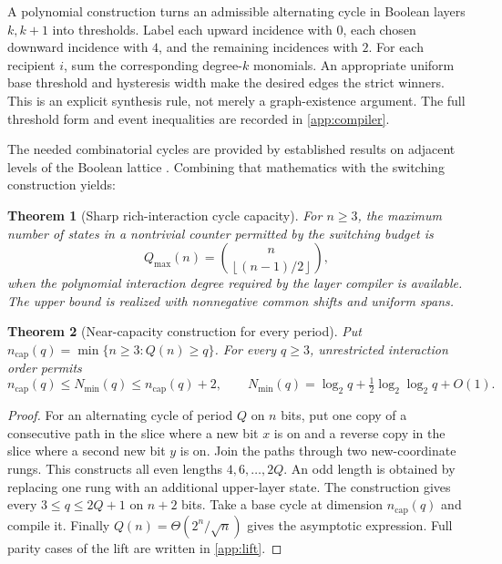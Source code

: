 \documentclass[12pt,letterpaper]{article}
\newtheorem{theorem}{Theorem}[section]
\theoremstyle{definition}\newtheorem{definition}[theorem]{Definition}
\theoremstyle{remark}\newtheorem{remark}[theorem]{Remark}
\newcommand{\Nmin}{N_{\min}}
\newcommand{\floor}[1]{\left\lfloor #1\right\rfloor}
\begin{document}
A polynomial construction turns an admissible alternating cycle in Boolean layers $k,k+1$ into thresholds. Label each upward incidence with $0$, each chosen downward incidence with $4$, and the remaining incidences with $2$. For each recipient $i$, sum the corresponding degree-$k$ monomials. An appropriate uniform base threshold and hysteresis width make the desired edges the strict winners. This is an explicit synthesis rule, not merely a graph-existence argument. The full threshold form and event inequalities are recorded in \cref{app:compiler}.

The needed combinatorial cycles are provided by established results on adjacent levels of the Boolean lattice \citep{mutzesu2017,mutze2016}. Combining that mathematics with the switching construction yields:
\begin{theorem}[Sharp rich-interaction cycle capacity]\label{thm:capacity}
For $n\ge3$, the maximum number of states in a nontrivial counter permitted by the switching budget is
\begin{equation}\label{eq:sharp}
 Q_{\max}(n)=\binom{n}{\floor{(n-1)/2}},
\end{equation}
when the polynomial interaction degree required by the layer compiler is available. The upper bound is realized with nonnegative common shifts and uniform spans.
\end{theorem}

\begin{theorem}[Near-capacity construction for every period]\label{thm:everyperiod}
Put $n_{\mathrm{cap}}(q)=\min\{n\ge3:Q(n)\ge q\}$. For every $q\ge3$, unrestricted interaction order permits
\begin{equation}\label{eq:nearc}
 n_{\mathrm{cap}}(q)\le\Nmin(q)\le n_{\mathrm{cap}}(q)+2,\qquad
 \Nmin(q)=\log_2 q+\tfrac12\log_2\log_2 q+O(1).
\end{equation}
\end{theorem}
\begin{proof}
For an alternating cycle of period $Q$ on $n$ bits, put one copy of a consecutive path in the slice where a new bit $x$ is on and a reverse copy in the slice where a second new bit $y$ is on. Join the paths through two new-coordinate rungs. This constructs all even lengths $4,6,\ldots,2Q$. An odd length is obtained by replacing one rung with an additional upper-layer state. The construction gives every $3\le q\le2Q+1$ on $n+2$ bits. Take a base cycle at dimension $n_{\mathrm{cap}}(q)$ and compile it. Finally $Q(n)=\Theta(2^n/\sqrt n)$ gives the asymptotic expression. Full parity cases of the lift are written in \cref{app:lift}.
\end{proof}
\end{document}
